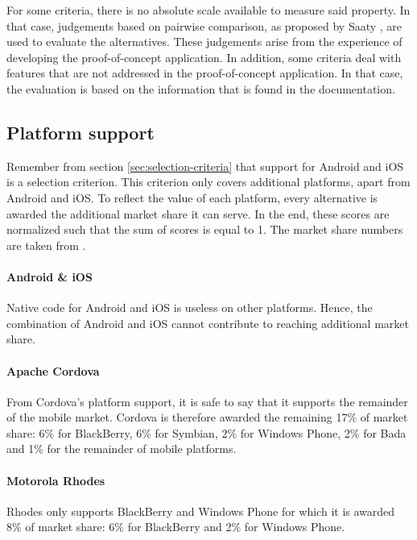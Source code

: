 For some criteria, there is no absolute scale available to measure said property. In that case, judgements based on pairwise comparison, as proposed by Saaty \cite{Saaty:1980}, are used to evaluate the alternatives. These judgements arise from the experience of developing the proof-of-concept application. In addition, some criteria deal with features that are not addressed in the proof-of-concept application. In that case, the evaluation is based on the information that is found in the documentation. 


\subsection{Platform support}

Remember from section \ref{sec:selection-criteria} that support for Android and iOS is a selection criterion. This criterion only covers additional platforms, apart from Android and iOS. To reflect the value of each platform, every alternative is awarded the additional market share it can serve. In the end, these scores are normalized such that the sum of scores is equal to 1. The market share numbers are taken from .

\paragraph{Android \& iOS} Native code for Android and iOS is useless on other platforms. Hence, the combination of Android and iOS cannot contribute to reaching additional market share.

\paragraph{Apache Cordova} From Cordova's platform support, it is safe to say that it supports the remainder of the mobile market. Cordova is therefore awarded the remaining 17\% of market share: 6\% for BlackBerry, 6\% for Symbian, 2\% for Windows Phone, 2\% for Bada and 1\% for the remainder of mobile platforms.

\paragraph{Motorola Rhodes} Rhodes only supports BlackBerry and Windows Phone for which it is awarded 8\% of market share: 6\% for BlackBerry and 2\% for Windows Phone. 

